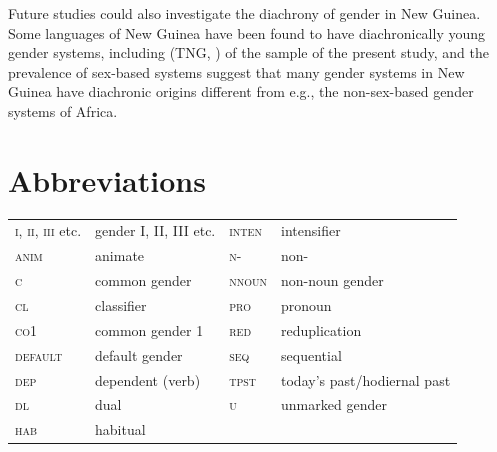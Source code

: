 \documentclass[output=collectionpaper]{langsci/langscibook}
\begin{document}
Future studies could also investigate the diachrony of gender in New Guinea. Some languages of New Guinea have been found to have diachronically young gender systems, including  (TNG, ) of the sample of the present study, and the prevalence of sex-based systems suggest that many gender systems in New Guinea have diachronic origins different from e.g., the non-sex-based gender systems of Africa.


\section*{Abbreviations}

\begin{tabular}{llll}
  \textsc{i, ii, iii} etc.	&	gender I, II, III etc.	&	\textsc{inten}	&	intensifier	\\
  \textsc{anim}	&	animate	&	\textsc{n-}	&	non-	\\
  \textsc{c}	&	common gender	&	\textsc{nnoun}	&	non-noun gender	\\
  \textsc{cl}	&	classifier	&	\textsc{pro}	&	pronoun	\\
  \textsc{co1}	&	common gender 1	&	\textsc{red}	&	reduplication	\\
  \textsc{default}	&	default gender	&	\textsc{seq}	&	sequential	\\
  \textsc{dep}	&	dependent (verb)	&	\textsc{tpst}	&	today's past/hodiernal past	\\
  \textsc{dl}	&	dual	&	\textsc{u}	&	unmarked gender	\\
  \textsc{hab}	&	habitual	&				\\
\end{tabular}


\printbibliography[heading=subbibliography,notkeyword=this]

\label{lastpage:Svaerd}
\end{document}
